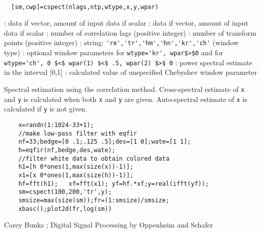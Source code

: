 \begin{mandesc}
   \\ %
\end{mandesc}
\begin{calling_sequence}
\begin{verbatim}
  [sm,cwp]=cspect(nlags,ntp,wtype,x,y,wpar)  
\end{verbatim}
\end{calling_sequence}
\begin{parameters}
  \begin{varlist}
    : data if vector, amount of input data if scalar
    : data if vector, amount of input data if scalar
    : number of correlation lags (positive integer)
    : number of transform points (positive integer)
    : string: \verb!'re','tr','hm','hn','kr','ch'! (window type)
    : optional window parameters for \verb!wtype='kr', wpar$>$0! and for \verb!wtype='ch', 0 $<$ wpar(1) $<$ .5, wpar(2) $>$ 0!
    : power spectral estimate in the interval [0,1]
    : calculated value of unspecified Chebyshev window parameter
  \end{varlist}
\end{parameters}
\begin{mandescription}
  Spectral estimation using the  correlation method.
  Cross-spectral estimate of \verb!x! and \verb!y! is calculated when both
  \verb!x! and \verb!y! are given. Auto-spectral estimate of \verb!x! is calculated
  if \verb!y! is not given.
\end{mandescription}
\begin{examples}
  \begin{Verbatim}
    x=randn(1:1024-33+1);
    //make low-pass filter with eqfir
    nf=33;bedge=[0 .1;.125 .5];des=[1 0];wate=[1 1];
    h=eqfir(nf,bedge,des,wate);
    //filter white data to obtain colored data 
    h1=[h 0*ones(1,max(size(x))-1)];
    x1=[x 0*ones(1,max(size(h))-1)];
    hf=fft(h1);   xf=fft(x1); yf=hf.*xf;y=real(ifft(yf));
    sm=cspect(100,200,'tr',y);
    smsize=max(size(sm));fr=(1:smsize)/smsize;
    xbasc();plot2d(fr,log(sm))
  \end{Verbatim}
\end{examples}
\begin{manseealso}
\end{manseealso}
\begin{authors}
  Carey Bunks ;  Digital Signal Processing by Oppenheim and Schafer
\end{authors}
